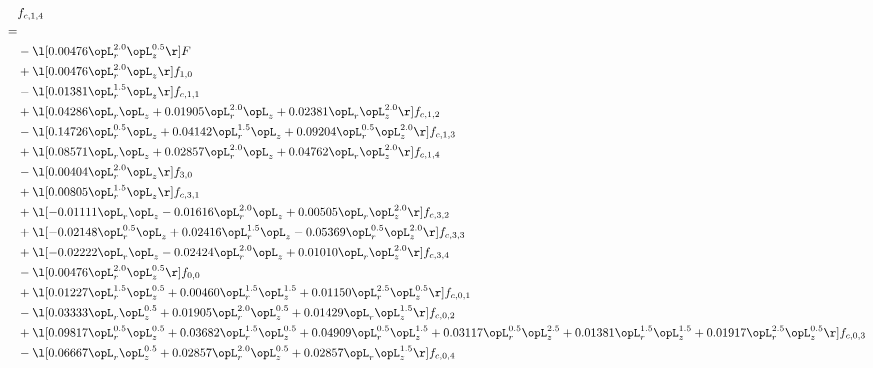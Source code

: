 \begin{alignat}{2} 
\label{eq:f_14_1} 
& f_{c,1,4} \nonumber \\ 
 = \\ 
& - \l[  0.00476 \opL_r^{2.0} \opL_z^{0.5}  \r] F \nonumber \\ 
& + \l[  0.00476 \opL_r^{2.0} \opL_z  \r] f_{1,0} \nonumber \\ 
& - \l[  0.01381 \opL_r^{1.5} \opL_z  \r] f_{c,1,1} \nonumber \\ 
& + \l[  0.04286 \opL_r \opL_z +  0.01905 \opL_r^{2.0} \opL_z +  0.02381 \opL_r \opL_z^{2.0}  \r] f_{c,1,2} \nonumber \\ 
& - \l[  0.14726 \opL_r^{0.5} \opL_z +  0.04142 \opL_r^{1.5} \opL_z +  0.09204 \opL_r^{0.5} \opL_z^{2.0}  \r] f_{c,1,3} \nonumber \\ 
& + \l[  0.08571 \opL_r \opL_z +  0.02857 \opL_r^{2.0} \opL_z +  0.04762 \opL_r \opL_z^{2.0}  \r] f_{c,1,4} \nonumber \\ 
& - \l[  0.00404 \opL_r^{2.0} \opL_z  \r] f_{3,0} \nonumber \\ 
& + \l[  0.00805 \opL_r^{1.5} \opL_z  \r] f_{c,3,1} \nonumber \\ 
& + \l[  -0.01111 \opL_r \opL_z   -0.01616 \opL_r^{2.0} \opL_z +  0.00505 \opL_r \opL_z^{2.0}  \r] f_{c,3,2} \nonumber \\ 
& + \l[  -0.02148 \opL_r^{0.5} \opL_z +  0.02416 \opL_r^{1.5} \opL_z   -0.05369 \opL_r^{0.5} \opL_z^{2.0}  \r] f_{c,3,3} \nonumber \\ 
& + \l[  -0.02222 \opL_r \opL_z   -0.02424 \opL_r^{2.0} \opL_z +  0.01010 \opL_r \opL_z^{2.0}  \r] f_{c,3,4} \nonumber \\ 
& - \l[  0.00476 \opL_r^{2.0} \opL_z^{0.5}  \r] f_{0,0} \nonumber \\ 
& + \l[  0.01227 \opL_r^{1.5} \opL_z^{0.5} +  0.00460 \opL_r^{1.5} \opL_z^{1.5} +  0.01150 \opL_r^{2.5} \opL_z^{0.5}  \r] f_{c,0,1} \nonumber \\ 
& - \l[  0.03333 \opL_r \opL_z^{0.5} +  0.01905 \opL_r^{2.0} \opL_z^{0.5} +  0.01429 \opL_r \opL_z^{1.5}  \r] f_{c,0,2} \nonumber \\ 
& + \l[  0.09817 \opL_r^{0.5} \opL_z^{0.5} +  0.03682 \opL_r^{1.5} \opL_z^{0.5} +  0.04909 \opL_r^{0.5} \opL_z^{1.5} +  0.03117 \opL_r^{0.5} \opL_z^{2.5} +  0.01381 \opL_r^{1.5} \opL_z^{1.5} +  0.01917 \opL_r^{2.5} \opL_z^{0.5}  \r] f_{c,0,3} \nonumber \\ 
& - \l[  0.06667 \opL_r \opL_z^{0.5} +  0.02857 \opL_r^{2.0} \opL_z^{0.5} +  0.02857 \opL_r \opL_z^{1.5}  \r] f_{c,0,4} \nonumber \\ 

\end{alignat}
